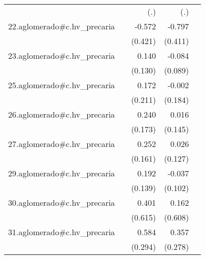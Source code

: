 {\begin{longtable}{l*{4}{D{.}{.}{-1}}}
            &                     &         (.)         &         (.)         &                     \\
\addlinespace
22.aglomerado#c.hv\_precaria&                     &      -0.572         &      -0.797         &                     \\
            &                     &     (0.421)         &     (0.411)         &                     \\
\addlinespace
23.aglomerado#c.hv\_precaria&                     &       0.140         &      -0.084         &                     \\
            &                     &     (0.130)         &     (0.089)         &                     \\
\addlinespace
25.aglomerado#c.hv\_precaria&                     &       0.172         &      -0.002         &                     \\
            &                     &     (0.211)         &     (0.184)         &                     \\
\addlinespace
26.aglomerado#c.hv\_precaria&                     &       0.240         &       0.016         &                     \\
            &                     &     (0.173)         &     (0.145)         &                     \\
\addlinespace
27.aglomerado#c.hv\_precaria&                     &       0.252         &       0.026         &                     \\
            &                     &     (0.161)         &     (0.127)         &                     \\
\addlinespace
29.aglomerado#c.hv\_precaria&                     &       0.192         &      -0.037         &                     \\
            &                     &     (0.139)         &     (0.102)         &                     \\
\addlinespace
30.aglomerado#c.hv\_precaria&                     &       0.401         &       0.162         &                     \\
            &                     &     (0.615)         &     (0.608)         &                     \\
\addlinespace
31.aglomerado#c.hv\_precaria&                     &       0.584\sym{*}  &       0.357         &                     \\
            &                     &     (0.294)         &     (0.278)         &                     \\

\end{longtable}}
